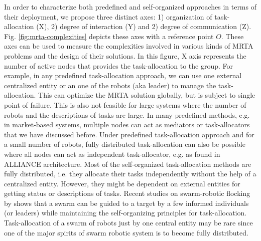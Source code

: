 In order to characterize both predefined and self-organized approaches in terms of their deployment, we propose three distinct axes: 1) organization of task-allocation (X), 2) degree of interaction (Y) and 2) degree of communication (Z). Fig. \ref{fig:mrta-complexities} depicts these axes with a reference point $O$. These axes can be used to measure the complexities involved in various kinds of MRTA problems and the design of their solutions. In this  figure, X axis represents the number of active nodes that provides the task-allocation to the group. For example, in any predefined  task-allocation approach, we can use one external centralized entity or an one of the robots (aka leader) to manage the task-allocation. This can optimize the MRTA solution globally, but is subject to single point of failure. This is also not feasible for large systems where the number of robots and the descriptions of tasks are large. In many predefined methods, e.g. in market-based systems,  multiple nodes can act as mediators or task-allocators that we have discussed before. Under predefined task-allocation approach and for a small number of robots, fully distributed task-allocation can also be possible where all nodes can act as independent task-allocator, e.g. as found in ALLIANCE architecture. Most of the self-organized task-allocation methods are fully distributed, i.e. they allocate their tasks independently without the help of a centralized entity. However, they might be dependent on external entities for getting status or descriptions of tasks. Recent studies on swarm-robotic flocking by \cite{Celikkanat+2008} shows that a swarm can be guided to a target by a few informed individuals (or leaders) while  maintaining the self-organizing principles for task-allocation. Task-allocation of a swarm of robots  just by one central entity may be rare since one of the major spirits of swarm robotic system is to become fully distributed.\\
